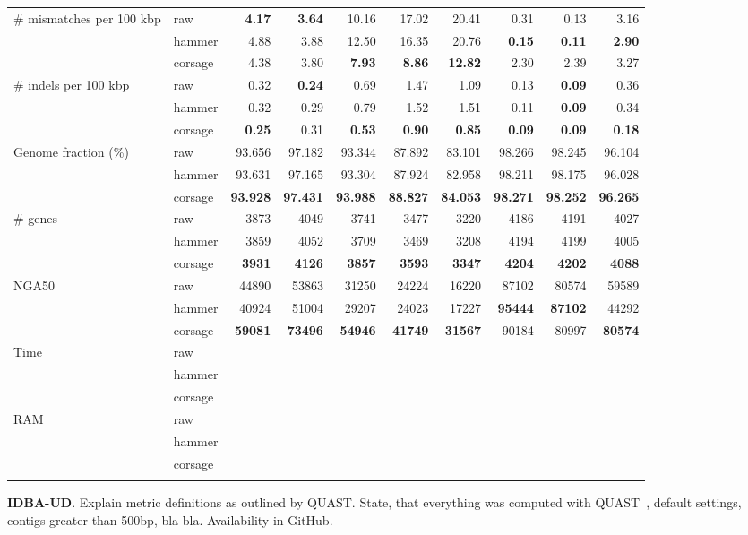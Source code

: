 \documentclass{bioinfo2}
\begin{document}
\begin{table}[p]
{\begin{tabular}{llrrrrrrrr}
\midrule
\# mismatches per 100 kbp & raw     & \textbf{4.17} & \textbf{3.64} & 10.16 & 17.02 & 20.41 & 0.31 & 0.13 & 3.16 \\
                          & hammer  & 4.88 & 3.88 & 12.50 & 16.35 & 20.76 & \textbf{0.15} & \textbf{0.11} & \textbf{2.90} \\
                          & corsage & 4.38 & 3.80 &  \textbf{7.93} &  \textbf{8.86} & \textbf{12.82} & 2.30 & 2.39 & 3.27 \\
\midrule
\# indels per 100 kbp & raw     & 0.32 & \textbf{0.24} & 0.69 & 1.47 & 1.09 & 0.13 & \textbf{0.09} & 0.36 \\
                      & hammer  & 0.32 & 0.29 & 0.79 & 1.52 & 1.51 & 0.11 & \textbf{0.09} & 0.34 \\
                      & corsage & \textbf{0.25} & 0.31 & \textbf{0.53} & \textbf{0.90} & \textbf{0.85} & \textbf{0.09} & \textbf{0.09} & \textbf{0.18} \\
\midrule
Genome fraction (\%) & raw     & 93.656 & 97.182 & 93.344 & 87.892 & 83.101 & 98.266 & 98.245 & 96.104 \\
                     & hammer  & 93.631 & 97.165 & 93.304 & 87.924 & 82.958 & 98.211 & 98.175 & 96.028 \\
                     & corsage & \textbf{93.928} & \textbf{97.431} & \textbf{93.988} & \textbf{88.827} & \textbf{84.053} & \textbf{98.271} & \textbf{98.252} & \textbf{96.265} \\
\midrule
\# genes & raw     & 3873 & 4049 & 3741 & 3477 & 3220 & 4186 & 4191 & 4027 \\
         & hammer  & 3859 & 4052 & 3709 & 3469 & 3208 & 4194 & 4199 & 4005 \\
         & corsage & \textbf{3931} & \textbf{4126} & \textbf{3857} & \textbf{3593} & \textbf{3347} & \textbf{4204} & \textbf{4202} & \textbf{4088} \\
\midrule
NGA50 & raw     & 44890 & 53863 & 31250 & 24224 & 16220 & 87102 & 80574 & 59589 \\
      & hammer  & 40924 & 51004 & 29207 & 24023 & 17227 & \textbf{95444} & \textbf{87102} & 44292 \\
      & corsage & \textbf{59081} & \textbf{73496} & \textbf{54946} & \textbf{41749} & \textbf{31567} & 90184 & 80997 & \textbf{80574} \\
\midrule
Time    & raw         &  \\
        & hammer      &  \\
        & corsage     &  \\
\midrule
RAM    & raw         &  \\
       & hammer      &  \\
       & corsage     &  \\
\botrule
\end{tabular}}
{\textbf{IDBA-UD}. Explain metric definitions as outlined by QUAST. State, that everything was computed with QUAST~\citep{quast}, default settings, contigs greater than 500bp, bla bla. Availability in GitHub.} %
\end{table}
\end{document}
